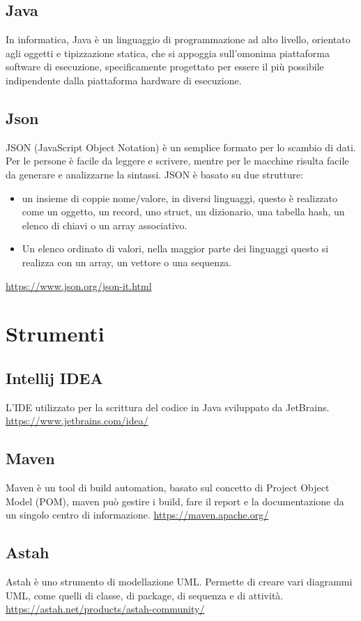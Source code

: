 \subsection*{Java}
In informatica, Java è un linguaggio di programmazione ad alto livello, orientato agli oggetti e tipizzazione statica, che si appoggia sull'omonima piattaforma software di esecuzione, specificamente progettato per essere il più possibile indipendente dalla piattaforma hardware di esecuzione.
\subsection*{Json}
JSON (JavaScript Object Notation) è un semplice formato per lo scambio di dati. Per le persone è facile da leggere e scrivere, mentre per le macchine risulta facile da generare e analizzarne la sintassi.
JSON è basato su due strutture:
\begin{itemize}
    \item un insieme di coppie nome/valore, in diversi linguaggi, questo è realizzato come un oggetto, un record, uno struct, un dizionario, una tabella hash, un elenco di chiavi o un array associativo.
    \item Un elenco ordinato di valori, nella maggior parte dei linguaggi questo si realizza con un array, un vettore o una sequenza.
\end{itemize}
\url{https://www.json.org/json-it.html}
\section{Strumenti}\label{sec:strumenti}
\subsection*{Intellij IDEA}
L'IDE utilizzato per la scrittura del codice in Java sviluppato da JetBrains.
\url{https://www.jetbrains.com/idea/}

\subsection*{Maven}
Maven è un tool di build automation, basato sul concetto di Project Object Model (POM), maven può gestire i build, fare il report e la documentazione da un singolo centro di informazione.
\url{https://maven.apache.org/}

\subsection*{Astah}
Astah è uno strumento di modellazione UML. Permette di creare vari diagrammi UML, come quelli di classe, di package, di sequenza e di attività.
\url{https://astah.net/products/astah-community/}

